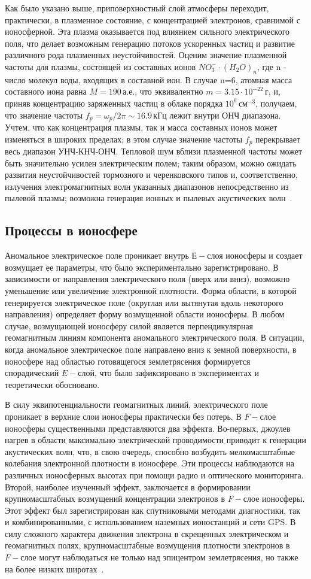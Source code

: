 \documentclass[12pt, oneside, a4paper]{article}
\begin{document}
Как было указано выше, приповерхностный слой атмосферы переходит, практически, в плазменное состояние, с концентрацией электронов, сравнимой с ионосферной.  Эта плазма оказывается под влиянием сильного электрического поля, что делает возможным генерацию потоков ускоренных частиц и развитие различного рода плазменных неустойчивостей. Оценим значение плазменной частоты для плазмы, состоящей из составных ионов $NO^-_3\cdot{}(H_2O)_n$, где n - число молекул воды, входящих в составной ион. В случае n=6, атомная масса составного иона равна $M=190$\,а.е., что эквивалентно $m=3.15\cdot{}10^{-22}$\,г, и, приняв концентрацию заряженных частиц в облаке порядка $10^6$\,см$^{-3}$, получаем, что значение частоты $f_p=\omega_p/2\pi\sim{}16.9$\,кГц лежит внутри ОНЧ диапазона. Учтем, что как концентрация плазмы, так и масса составных ионов может изменяться в широких пределах; в этом случае значение частоты $f_p$ перекрывает весь диапазон УНЧ-КНЧ-ОНЧ. Тепловой шум вблизи плазменной частоты может быть значительно усилен электрическим полем; таким образом, можно ожидать развития неустойчивостей тормозного и черенковского типов и, соответственно, излучения электромагнитных волн указанных диапазонов непосредственно из пылевой плазмы; возможна генерация ионных и пылевых акустических волн~\cite{Kikuchi:2001}. 
\subsection{Процессы в ионосфере}
Аномальное электрическое поле проникает внутрь $Е-$слоя ионосферы и создает возмущает ее параметры, что было экспериментально зарегистрировано. В зависимости от направления электрического поля (вверх или вниз), возможно уменьшение или увеличение электронной плотности. Форма области, в которой генерируется электрическое поле (округлая или вытянутая вдоль некоторого направления) определяет форму возмущенной области ионосферы. В любом случае,  возмущающей ионосферу силой является перпендикулярная геомагнитным линиям компонента аномального электрического поля. В ситуации, когда аномальное электрическое поле направлено вниз к земной поверхности, в ионосфере над областью готовящегося землетрясения формируется спорадический $E-$слой, что было зафиксировано в экспериментах и теоретически обосновано.

В силу эквипотенциальности геомагнитных линий, электрического поле проникает в верхние слои ионосферы практически без потерь. В $F-$слое ионосферы существенными представляются два эффекта. Во-первых, джоулев нагрев в области максимально электрической проводимости  приводит к генерации акустических волн, что, в свою очередь, способно возбудить мелкомасштабные колебания электронной плотности в ионосфере. Эти процессы наблюдаются на различных ионосферных высотах при помощи радио и оптического мониторинга. Второй, наиболее изученный эффект, заключается в формировании крупномасштабных возмущений концентрации электронов в $F-$слое ионосферы. Этот эффект был зарегистрирован как спутниковыми методами диагностики, так и комбинированными, с использованием наземных ионостанций и сети GPS. В силу сложного характера движения электрона в скрещенных электрическом и геомагнитных полях, крупномасштабные возмущения плотности электронов в $F-$слое могут наблюдаться  не только над  эпицентром землетрясения, но также на более низких широтах~\cite{Lui:2004}. 
\end{document}

